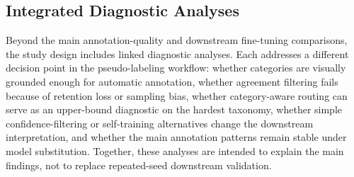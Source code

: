 \documentclass{ieeeaccess}
\providecommand{\DIFdelbegin}{} %
\providecommand{\DIFaddbeginFL}{} %
\providecommand{\DIFaddendFL}{} %
\providecommand{\DIFdelendFL}{} %
\newcommand{\DIFscaledelfig}{0.5}
\newlength{\DIFdelgraphicswidth} %
\newlength{\DIFdelgraphicsheight} %
\newcommand{\DIFaddincludegraphics}[2][]{{\color{blue}\fbox{\DIFOincludegraphics[#1]{#2}}}} %
\newcommand{\DIFdelincludegraphics}[2][]{%
\sbox{\DIFdelgraphicsbox}{\DIFOincludegraphics[#1]{#2}}%
\settoboxwidth{\DIFdelgraphicswidth}{\DIFdelgraphicsbox} %
\settoboxtotalheight{\DIFdelgraphicsheight}{\DIFdelgraphicsbox} %
\scalebox{\DIFscaledelfig}{%
\parbox[b]{\DIFdelgraphicswidth}{\usebox{\DIFdelgraphicsbox}\\[-\baselineskip] \rule{\DIFdelgraphicswidth}{0em}}\llap{\resizebox{\DIFdelgraphicswidth}{\DIFdelgraphicsheight}{%
\setlength{\unitlength}{\DIFdelgraphicswidth}%
\begin{picture}(1,1)%
\thicklines\linethickness{2pt} %
{\color[rgb]{1,0,0}\put(0,0){\framebox(1,1){}}}%
{\color[rgb]{1,0,0}\put(0,0){\line( 1,1){1}}}%
{\color[rgb]{1,0,0}\put(0,1){\line(1,-1){1}}}%
\end{picture}%
}\hspace*{3pt}}} %
} %
\DeclareRobustCommand{\DIFdelbegin}{\DIFOdelbegin \let\includegraphics\DIFdelincludegraphics} %
\DeclareRobustCommand{\DIFaddbeginFL}{\DIFOaddbeginFL \let\includegraphics\DIFaddincludegraphics} %
\DeclareRobustCommand{\DIFaddendFL}{\DIFOaddendFL \let\includegraphics\DIFOincludegraphics} %
\DeclareRobustCommand{\DIFdelendFL}{\DIFOaddendFL \let\includegraphics\DIFOincludegraphics} %
\begin{document}
\DIFdelbegin %
\DIFdelendFL \DIFaddbeginFL \begin{table}[!ht]
\DIFaddendFL \caption{Seed policy by analysis module.
Main-matrix LP uses repeated-seed evaluation; targeted LoRA
replication is reported for BowTurnHead and TeacherBehavior under None
and GT; auxiliary diagnostics and the remaining LoRA reference cells
remain protocol-matched single-run/fixed-seed analyses.}
\label{tab:seed_policy}
\centering
{}
\end{table}

\subsection{Integrated Diagnostic Analyses}
\label{sec:additional_experiments}

Beyond the main annotation-quality and downstream fine-tuning
comparisons, the study design includes linked diagnostic analyses.
Each addresses a different decision point in the pseudo-labeling
workflow: whether categories are visually grounded enough for automatic
annotation, whether agreement filtering fails because of retention loss
or sampling bias, whether category-aware routing can serve as an
upper-bound diagnostic on the hardest taxonomy, whether simple
confidence-filtering or self-training alternatives change the
downstream interpretation, and whether the main annotation patterns
remain stable under model substitution.
Together, these analyses are intended to explain the main findings,
not to replace repeated-seed downstream validation.
\end{document}
